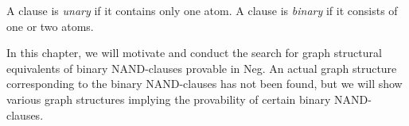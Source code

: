 \begin{definition}
  A clause is \textit{unary} if it contains only one atom.
  A clause is \textit{binary} if it consists of one or two atoms.
\end{definition}
In this chapter, we will motivate and conduct the search for graph structural equivalents of binary NAND-clauses provable in Neg.
An actual graph structure corresponding to the binary NAND-clauses has not been found, but we will show various graph structures implying the provability of certain binary NAND-clauses.
